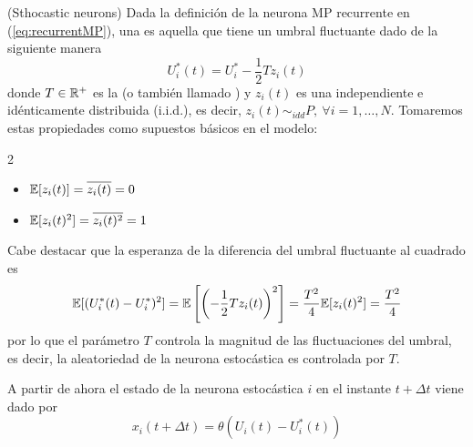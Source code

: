 \begin{definicion}(Sthocastic neurons)
    Dada la definición de la neurona MP recurrente en (\ref{eq:recurrentMP}), una  es aquella que tiene un umbral fluctuante dado de la siguiente manera
    \begin{equation*}
        U_i^* (t) = U_i^* -\dfrac{1}{2} Tz_i (t)
    \end{equation*}
    donde $T\in\mathbb{R}^+$ es la  (o también llamado ) y $z_i(t)$ es una  independiente e idénticamente distribuida (i.i.d.), es decir, $z_i (t) \sim_{idd} P, \ \forall i=1, \dots, N$. Tomaremos estas propiedades como supuestos básicos en el modelo:
    \begin{multicols}{2}
        \begin{itemize}
            \item $\mathbb{E}[z_i(t)] = \overline{z_i(t)} = 0$
            \item $\mathbb{E}[z_i(t)^2] = \overline{z_i(t)^2} = 1$
        \end{itemize}
    \end{multicols}
\end{definicion}

\noindent
Cabe destacar que la esperanza de la diferencia del umbral fluctuante al cuadrado es
\begin{equation*}
    \mathbb{E}[(U_i^* (t) - U_i^*)^2] = \mathbb{E}\left[\left(-\dfrac{1}{2} Tz_i (t)\right)^2\right] = \dfrac{T^2}{4} \mathbb{E}[z_i(t)^2] = \dfrac{T^2}{4}
\end{equation*}
por lo que el parámetro $T$ controla la magnitud de las fluctuaciones del umbral, es decir, la aleatoriedad de la neurona estocástica es controlada por $T$.

\noindent
A partir de ahora el estado de la neurona estocástica $i$ en el instante $t + \Delta t$ viene dado por
\begin{equation*}
    x_i (t + \Delta t) = \theta\left( U_i(t)-U_i^*(t)\right)
\end{equation*}

